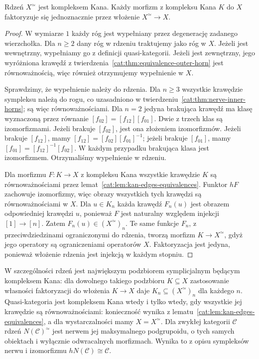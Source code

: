\begin{twierdzenie}\label{cat:thm:quasicat-core}
Rdzeń $X^\simeq$ jest kompleksem Kana. Każdy morfizm z kompleksu Kana $K$ do $X$ faktoryzuje się jednoznacznie przez włożenie $X^\simeq\to X$.
\end{twierdzenie}
\begin{proof}
W wymiarze $1$ każdy róg jest wypełniany przez degenerację zadanego wierzchołka. Dla $n\geq2$ dany róg w rdzeniu traktujemy jako róg w $X$. Jeżeli jest wewnętrzny, wypełniamy go z definicji quasi-kategorii. Jeżeli jest zewnętrzny, jego wyróżniona krawędź z twierdzenia~\ref{cat:thm:equivalence-outer-horn} jest równoważnością, więc również otrzymujemy wypełnienie w $X$.

Sprawdzimy, że wypełnienie należy do rdzenia. Dla $n\geq3$ wszystkie krawędzie sympleksu należą do rogu, co uzasadniono w twierdzeniu~\ref{cat:thm:nerve-inner-horns}; są więc równoważnościami. Dla $n=2$ jedyna brakująca krawędź ma klasę wyznaczoną przez równanie $[f_{02}]=[f_{12}][f_{01}]$. Dwie z trzech klas są izomorfizmami. Jeżeli brakuje $[f_{02}]$, jest ona złożeniem izomorfizmów. Jeżeli brakuje $[f_{12}]$, mamy $[f_{12}]=[f_{02}][f_{01}]^{-1}$; jeżeli brakuje $[f_{01}]$, mamy $[f_{01}]=[f_{12}]^{-1}[f_{02}]$. W każdym przypadku brakująca klasa jest izomorfizmem. Otrzymaliśmy wypełnienie w rdzeniu.

Dla morfizmu $F:K\to X$ z kompleksu Kana wszystkie krawędzie $K$ są równoważnościami przez lemat~\ref{cat:lem:kan-edges-equivalences}. Funktor $hF$ zachowuje izomorfizmy, więc obrazy wszystkich tych krawędzi są równoważnościami w $X$. Dla $u\in K_n$ każda krawędź $F_n(u)$ jest obrazem odpowiedniej krawędzi $u$, ponieważ $F$ jest naturalny względem injekcji $[1]\to[n]$. Zatem $F_n(u)\in(X^\simeq)_n$. Te same funkcje $F_n$, z przeciwdziedzinami ograniczonymi do rdzenia, tworzą morfizm $K\to X^\simeq$, gdyż jego operatory są ograniczeniami operatorów $X$. Faktoryzacja jest jedyna, ponieważ włożenie rdzenia jest injekcją w każdym stopniu.
\end{proof}
W szczególności rdzeń jest największym podzbiorem symplicjalnym będącym kompleksem Kana: dla dowolnego takiego podzbioru $K\subseteq X$ zastosowanie własności faktoryzacji do włożenia $K\to X$ daje $K_n\subseteq(X^\simeq)_n$ dla każdego $n$. Quasi-kategoria jest kompleksem Kana wtedy i tylko wtedy, gdy wszystkie jej krawędzie są równoważnościami: konieczność wynika z lematu~\ref{cat:lem:kan-edges-equivalences}, a dla wystarczalności mamy $X=X^\simeq$. Dla zwykłej kategorii $\mathcal C$ rdzeń $N(\mathcal C)^\simeq$ jest nerwem jej maksymalnego podgrupoidu, o tych samych obiektach i wyłącznie odwracalnych morfizmach. Wynika to z opisu sympleksów nerwu i izomorfizmu $hN(\mathcal C)\cong\mathcal C$.

